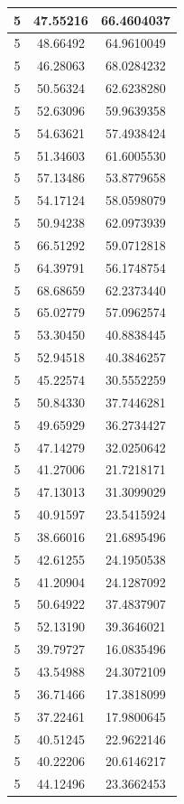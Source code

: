 \documentclass[
]{book}
\begin{document}
\begin{tabular}{c|c|c}
\hline
5 & 47.55216 & 66.4604037\\
\hline
5 & 48.66492 & 64.9610049\\
\hline
5 & 46.28063 & 68.0284232\\
\hline
5 & 50.56324 & 62.6238280\\
\hline
5 & 52.63096 & 59.9639358\\
\hline
5 & 54.63621 & 57.4938424\\
\hline
5 & 51.34603 & 61.6005530\\
\hline
5 & 57.13486 & 53.8779658\\
\hline
5 & 54.17124 & 58.0598079\\
\hline
5 & 50.94238 & 62.0973939\\
\hline
5 & 66.51292 & 59.0712818\\
\hline
5 & 64.39791 & 56.1748754\\
\hline
5 & 68.68659 & 62.2373440\\
\hline
5 & 65.02779 & 57.0962574\\
\hline
5 & 53.30450 & 40.8838445\\
\hline
5 & 52.94518 & 40.3846257\\
\hline
5 & 45.22574 & 30.5552259\\
\hline
5 & 50.84330 & 37.7446281\\
\hline
5 & 49.65929 & 36.2734427\\
\hline
5 & 47.14279 & 32.0250642\\
\hline
5 & 41.27006 & 21.7218171\\
\hline
5 & 47.13013 & 31.3099029\\
\hline
5 & 40.91597 & 23.5415924\\
\hline
5 & 38.66016 & 21.6895496\\
\hline
5 & 42.61255 & 24.1950538\\
\hline
5 & 41.20904 & 24.1287092\\
\hline
5 & 50.64922 & 37.4837907\\
\hline
5 & 52.13190 & 39.3646021\\
\hline
5 & 39.79727 & 16.0835496\\
\hline
5 & 43.54988 & 24.3072109\\
\hline
5 & 36.71466 & 17.3818099\\
\hline
5 & 37.22461 & 17.9800645\\
\hline
5 & 40.51245 & 22.9622146\\
\hline
5 & 40.22206 & 20.6146217\\
\hline
5 & 44.12496 & 23.3662453\\

\end{tabular}
\end{document}

